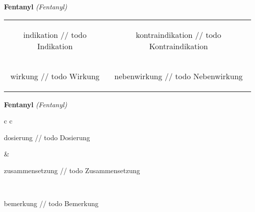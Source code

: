 \documentclass[12pt]{beamer}
\begin{document}
\begin{frame}{
    \textbf{Fentanyl}
    \textit{(Fentanyl)}
}
    \begin{tabular}{c c}
        \begin{beamercolorbox}[wd=\boxwidth\textwidth,ht=\boxheight\textheight,sep=1em]{indikation}
        // todo Indikation
        \end{beamercolorbox} & 
        \begin{beamercolorbox}[wd=\boxwidth\textwidth,ht=\boxheight\textheight,sep=1em]{kontraindikation}
        // todo Kontraindikation 
        \end{beamercolorbox} \\
        \begin{beamercolorbox}[wd=\boxwidth\textwidth,ht=\boxheight\textheight,sep=1em]{wirkung}
        // todo Wirkung
        \end{beamercolorbox} & 
        \begin{beamercolorbox}[wd=\boxwidth\textwidth,ht=\boxheight\textheight,sep=1em]{nebenwirkung}
        // todo Nebenwirkung
        \end{beamercolorbox} \\
    \end{tabular}
\end{frame}

\begin{frame}{
    \textbf{Fentanyl}
    \textit{(Fentanyl)}
}
    \begin{tabular}{c c}
        \begin{beamercolorbox}[wd=\boxwidth\textwidth,ht=\boxheight\textheight,sep=1em]{dosierung}
        // todo Dosierung
        \end{beamercolorbox} & 
        \begin{beamercolorbox}[wd=\boxwidth\textwidth,ht=\boxheight\textheight,sep=1em]{zusammensetzung}
        // todo Zusammensetzung
        \end{beamercolorbox} \\
        \begin{beamercolorbox}[wd=\textwidth,ht=\boxheight\textheight,sep=1em]{bemerkung}
        // todo Bemerkung
        \end{beamercolorbox} \\
    \end{tabular}
\end{frame}
\end{document}
